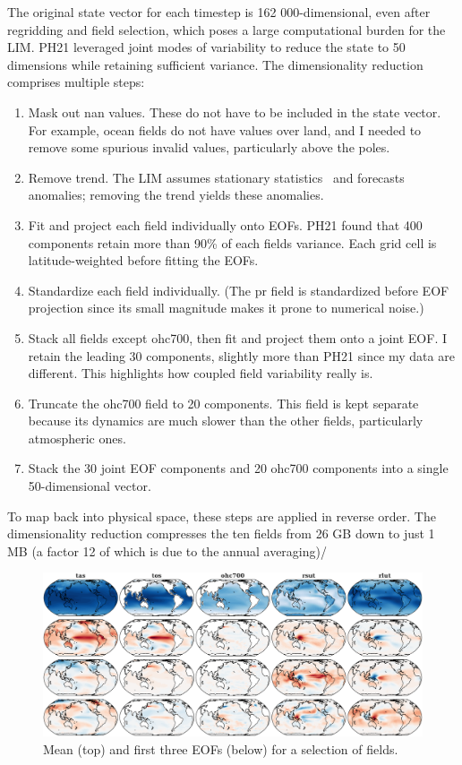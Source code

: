 \documentclass[parskip=half,DIV=16]{scrartcl}
\begin{document}
The original state vector for each timestep is 162 000-dimensional, even after regridding and field selection, which poses a large computational burden for the \gls{LIM}. PH21 leveraged joint modes of variability to reduce the state to 50 dimensions while retaining sufficient variance. The dimensionality reduction comprises multiple steps:
\begin{enumerate}
    \item Mask out nan values. These do not have to be included in the state vector. For example, ocean fields do not have values over land, and I needed to remove some spurious invalid values, particularly above the poles.
    \item Remove trend. The \gls{LIM} assumes stationary statistics~\parencite{Penland1995} and forecasts anomalies; removing the trend yields these anomalies.
    \item Fit and project each field individually onto \glspl{EOF}. PH21 found that 400 components retain more than 90\% of each fields variance. Each grid cell is latitude-weighted before fitting the \glspl{EOF}.
    \item Standardize each field individually. (The pr field is standardized before EOF projection since its small magnitude makes it prone to numerical noise.)
    \item Stack all fields except ohc700, then fit and project them onto a joint \gls{EOF}. I retain the leading 30 components, slightly more than PH21 since my data are different. This highlights how coupled field variability really is.
    \item Truncate the ohc700 field to 20 components. This field is kept separate because its dynamics are much slower than the other fields, particularly atmospheric ones.
    \item Stack the 30 joint EOF components and 20 ohc700 components into a single 50-dimensional vector.
\end{enumerate}
To map back into physical space, these steps are applied in reverse order. The dimensionality reduction compresses the ten fields from 26 GB down to just 1 MB (a factor 12 of which is due to the annual averaging)/

\begin{figure}[h]
    \centering
    \includegraphics[width=\textwidth]{figures/plots/eofs.pdf}
    \caption{Mean (top) and first three \glspl{EOF} (below) for a selection of fields.}
    \label{fig:eofs-mine}
\end{figure}
\end{document}
